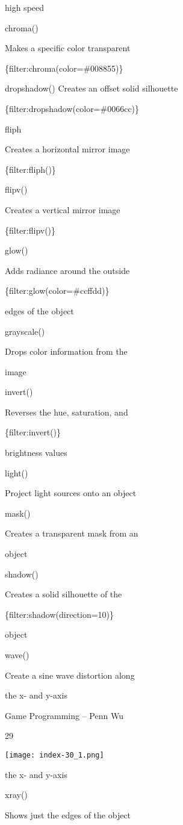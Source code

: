 \documentclass[
]{article}
\begin{document}
high speed

chroma()

Makes a specific color transparent

\{filter:chroma(color=\#008855)\}

dropshadow() Creates an offset solid silhouette

\{filter:dropshadow(color=\#0066cc)\}

fliph

Creates a horizontal mirror image

\{filter:fliph()\}

flipv()

Creates a vertical mirror image

\{filter:flipv()\}

glow()

Adds radiance around the outside

\{filter:glow(color=\#ccffdd)\}

edges of the object

grayscale()

Drops color information from the

image

invert()

Reverses the hue, saturation, and

\{filter:invert()\}

brightness values

light()

Project light sources onto an object

mask()

Creates a transparent mask from an

object

shadow()

Creates a solid silhouette of the

\{filter:shadow(direction=10)\}

object

wave()

Create a sine wave distortion along

the x- and y-axis

Game Programming -- Penn Wu

29

\protect\hypertarget{index_split_003.htmlux5cux23p30}{}{}\texttt{[image: index-30\_1.png]}

the x- and y-axis

xray()

Shows just the edges of the object
\end{document}
